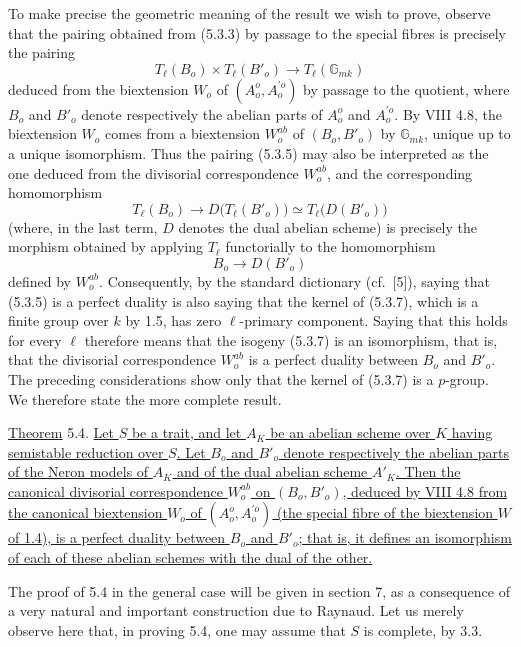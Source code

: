 To make precise the geometric meaning of the result we wish to prove,
observe that the pairing obtained from (5.3.3) by passage to the
special fibres is precisely the pairing
\begin{equation}\tag{5.3.5}
 T_\ell(B_o)\times T_\ell(B'_o)
 \longrightarrow T_\ell(\mathbb G_{mk})
\end{equation}
deduced from the biextension $W_o$ of
$(A_o^o,A_o^{\prime o})$ by passage to the quotient, where
$B_o$ and $B'_o$ denote respectively the abelian parts of
$A_o^o$ and $A_o^{\prime o}$.  By VIII 4.8, the biextension
$W_o$ comes from a biextension $W_o^{ab}$ of
$(B_o,B'_o)$ by $\mathbb G_{mk}$, unique up to a unique
isomorphism.  Thus the pairing (5.3.5) may also be interpreted as the
one deduced from the divisorial correspondence $W_o^{ab}$, and the
corresponding homomorphism
\begin{equation}\tag{5.3.6}
 T_\ell(B_o)
 \longrightarrow D\bigl(T_\ell(B'_o)\bigr)
 \simeq T_\ell\bigl(D(B'_o)\bigr)
\end{equation}
(where, in the last term, $D$ denotes the dual abelian scheme) is
precisely the morphism obtained by applying $T_\ell$ functorially to
the homomorphism
\begin{equation}\tag{5.3.7}
 B_o\longrightarrow D(B'_o)
\end{equation}
defined by $W_o^{ab}$.  Consequently, by the standard dictionary
(cf.\ [5]), saying that (5.3.5) is a perfect duality is also saying that
the kernel of (5.3.7), which is a finite group over $k$ by 1.5, has
zero $\ell$-primary component.  Saying that this holds for every
$\ell$ therefore means that the isogeny (5.3.7) is an isomorphism,
that is, that the divisorial correspondence $W_o^{ab}$ is a perfect
duality between $B_o$ and $B'_o$.  The preceding considerations
show only that the kernel of (5.3.7) is a $p$-group.  We therefore
state the more complete result.

\medskip
\noindent
\underline{Theorem} 5.4. \underline{Let $S$ be a trait, and let
$A_K$ be an abelian scheme over $K$ having semistable reduction
over $S$.  Let $B_o$ and $B'_o$ denote respectively the
abelian parts of the Neron models of $A_K$ and of the dual abelian
scheme $A'_K$.  Then the canonical divisorial correspondence
$W_o^{ab}$ on $(B_o,B'_o)$, deduced by VIII 4.8 from the
canonical biextension $W_o$ of $(A_o^o,A_o^{\prime o})$ (the
special fibre of the biextension $W$ of 1.4), is a perfect duality
between $B_o$ and $B'_o$; that is, it defines an isomorphism
of each of these abelian schemes with the dual of the other.}

The proof of 5.4 in the general case will be given in section 7, as a
consequence of a very natural and important construction due to
Raynaud.  Let us merely observe here that, in proving 5.4, one may
assume that $S$ is complete, by 3.3.
